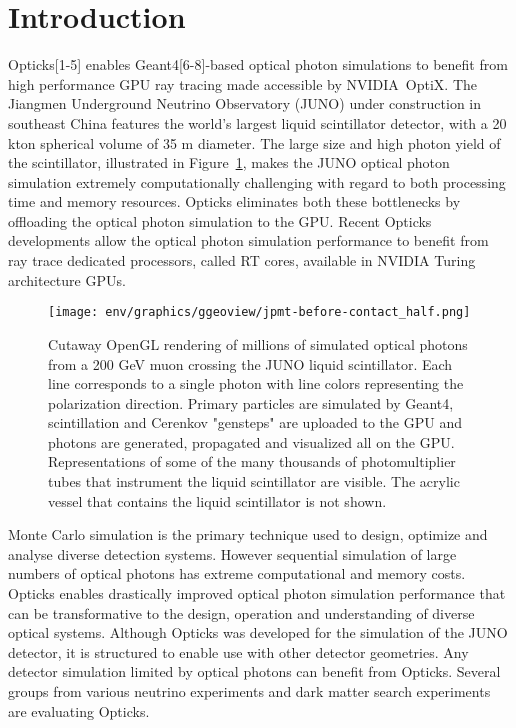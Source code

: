 \documentclass{webofc}
\newcommand{\comment}[1]{}
\begin{document}
\section{Introduction}%
\label{intro}
%
\comment{
The introduction should provide background that puts the manuscript into
context and allows readers outside the field to understand the purpose and
significance of the study. It should define the problem addressed and explain
why it is important.
}
%
Opticks[1-5] enables Geant4[6-8]-based optical photon simulations 
to benefit from high performance GPU ray tracing made accessible 
by NVIDIA\textregistered\ OptiX\texttrademark[9-11].
%
The Jiangmen Underground Neutrino Observatory (JUNO)\cite{juno} 
under construction in southeast China features the world's largest liquid scintillator detector, 
with a 20 kton spherical volume of 35 m diameter. The large size and high photon yield
of the scintillator, illustrated in Figure~\ref{problem},  makes the JUNO optical photon simulation extremely computationally 
challenging with regard to both processing time and memory resources. Opticks eliminates both these 
bottlenecks by offloading the optical photon simulation to the GPU. 
%
Recent Opticks developments allow the optical photon simulation performance 
to benefit from ray trace dedicated processors, called RT cores\cite{rtx}, 
available in NVIDIA Turing architecture GPUs.
%
\begin{figure}
\centering
\texttt{[image: env/graphics/ggeoview/jpmt-before-contact\_half.png]}
\caption{Cutaway OpenGL rendering of millions of simulated optical photons from a 200 GeV muon crossing the JUNO liquid scintillator. 
Each line corresponds to a single photon with line colors representing the polarization direction. Primary particles
are simulated by Geant4, scintillation and Cerenkov "gensteps" are uploaded to the GPU and photons are generated, propagated
and visualized all on the GPU. Representations of some of the many thousands of photomultiplier tubes that instrument the liquid scintillator are visible.
The acrylic vessel that contains the liquid scintillator is not shown.
}
\label{problem}
\end{figure}%
%
Monte Carlo simulation is the primary technique used to design, optimize 
and analyse diverse detection systems. However sequential simulation of large numbers of 
optical photons has extreme computational and memory costs. 
Opticks enables drastically improved optical photon simulation performance that can be transformative 
to the design, operation and understanding of diverse optical systems.
%
Although Opticks was developed for the simulation of the JUNO detector, it 
is structured to enable use with other detector geometries. 
Any detector simulation limited by optical photons 
can benefit from Opticks.
Several groups from various neutrino experiments and dark matter search experiments are 
evaluating Opticks.
\end{document}

